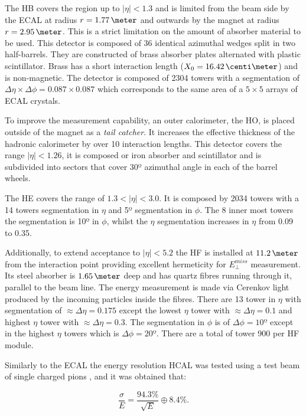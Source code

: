 The \acrfull{HB} covers the region up to $|\eta|<1.3$ and is limited from the beam side by the \gls{ECAL} at radius $r=1.77\,\meter$ and outwards by the magnet at radius $r=2.95\,\meter$. This is a strict limitation on the amount of absorber material to be used. This detector is composed of 36 identical azimuthal wedges split in two half-barrels. They are constructed of brass absorber plates alternated with plastic scintillator. Brass has a short interaction length ($X_0=16.42\,\centi\meter$) and is non-magnetic. The detector is composed of 2304 towers with a segmentation of $\Delta\eta \times \Delta\phi = 0.087 \times 0.087$ which corresponds to the same area of a $5 \times 5$ arrays of \gls{ECAL} crystals.

To improve the measurement capability, an outer calorimeter, the \acrfull{HO}, is placed outside of the magnet as a \textit{tail catcher}. It increases the effective thickness of the hadronic calorimeter by over 10 interaction lengths. This detector covers the range $|\eta|<1.26$, it is composed or iron absorber and scintillator and is subdivided into sectors that cover 30º azimuthal angle in each of the barrel wheels. 

The \acrfull{HE} covers the range of $1.3<|\eta|<3.0$. It is composed by 2034 towers with a 14 towers segmentation in $\eta$ and 5º segmentation in $\phi$. The 8 inner most towers the segmentation is 10º in $\phi$, whilst the $\eta$ segmentation increases in $\eta$ from 0.09 to 0.35.

Additionally, to extend acceptance to $|\eta|<5.2$ the \gls{HF} is installed at $11.2\,\meter$ from the interaction point providing excellent hermeticity for $E_{\perp}^{miss}$ measurement. Its steel absorber is $1.65\,\meter$ deep and has quartz fibres running through it, parallel to the beam line. The energy measurement is made via Cerenkov light produced by the incoming particles inside the fibres. There are 13 tower in $\eta$ with segmentation of $\approx \Delta\eta=0.175$ except the lowest $\eta$ tower with $\approx \Delta\eta=0.1$ and highest $\eta$ tower with $\approx \Delta\eta=0.3$. The segmentation in $\phi$ is of $\Delta\phi=10º$ except in the highest $\eta$ towers which is $\Delta\phi=20º$. There are a total of tower 900 per \gls{HF} module. 

Similarly to the \gls{ECAL} the energy resolution \gls{HCAL} was tested using a test beam of single charged pions \cite{ARTICLE:CMSECALTestBeam}, and it was obtained that:

\begin{equation}
\frac{\sigma}{E} = \frac{94.3\%}{\sqrt{E}} \oplus 8.4\%.
\end{equation}

